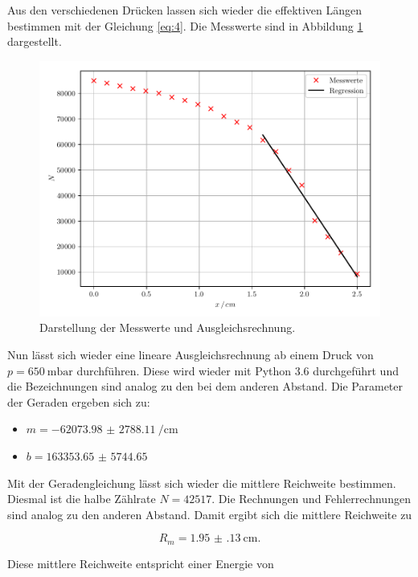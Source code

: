 Aus den verschiedenen Drücken lassen sich wieder die effektiven Längen bestimmen mit
der Gleichung \ref{eq:4}. Die Messwerte sind in Abbildung \ref{abb:4} dargestellt.

\begin{figure}[H]
  \centering
  \includegraphics{plot3.pdf}
  \caption{Darstellung der Messwerte und Ausgleichsrechnung.}
  \label{abb:4}
\end{figure}

Nun lässt sich wieder eine lineare Ausgleichsrechnung ab einem Druck von $p = \SI{650}{\milli\bar}$
durchführen. Diese wird wieder mit Python 3.6 durchgeführt und die Bezeichnungen sind analog zu
den bei dem anderen Abstand. Die Parameter der Geraden ergeben sich zu:

\begin{itemize}
  \item $m = \SI{-62073.98(278811)}{\per\centi\meter}$
  \item $b = \num{163353.65(574465)}$
\end{itemize}

Mit der Geradengleichung lässt sich wieder die mittlere Reichweite bestimmen.
Diesmal ist die halbe Zählrate $N = 42517$.
Die Rechnungen und Fehlerrechnungen sind analog zu den anderen Abstand. Damit ergibt
sich die mittlere Reichweite zu

\begin{equation*}
  R_m = \SI{1.95(13)}{\centi\meter}.
\end{equation*}

Diese mittlere Reichweite entspricht einer Energie von

